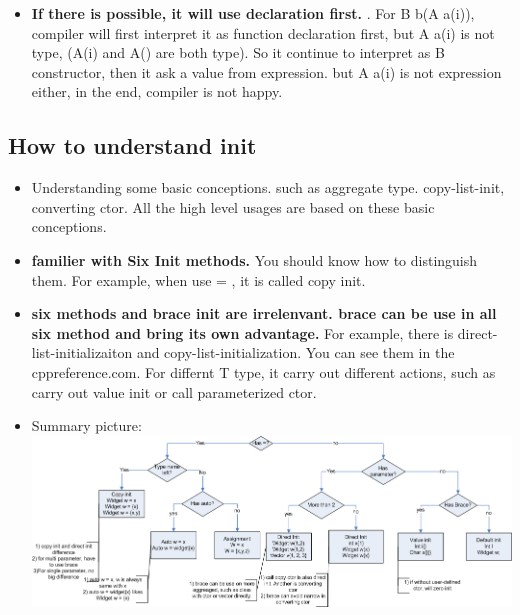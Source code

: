 \documentclass[a4paper,11pt,twoside]{book}
\begin{document}
\begin{itemize}
	\item \textbf{If there is possible, it will use declaration first. }. For B b(A a(i)), compiler will first interpret it as function declaration first, but A a(i) is not type, (A(i) and A() are both type). So it continue to interpret as B constructor, then it ask a value from expression. but A a(i) is not expression either, in the end, compiler is not happy. 
	
\end{itemize}

\subsection{How to understand init}
\begin{itemize}
	\item Understanding some basic conceptions. such as aggregate type. copy-list-init, converting ctor. All the high level usages are based on these basic conceptions. 
	
	\item \textbf{familier with Six Init methods.} You should know how to distinguish them. For example, when use = , it is called copy init. 
	
	\item \textbf{six methods and brace init are irrelenvant. brace can be use in all six method and bring its own advantage.} For example, there is direct-list-initializaiton and copy-list-initialization. You can see them in the cppreference.com. For differnt T type, it carry out different actions, such as carry out value init or call parameterized ctor.
	
	\item Summary picture: \\
	\includegraphics[scale=0.42]{pics/init.png}
\end{itemize}
\end{document}
